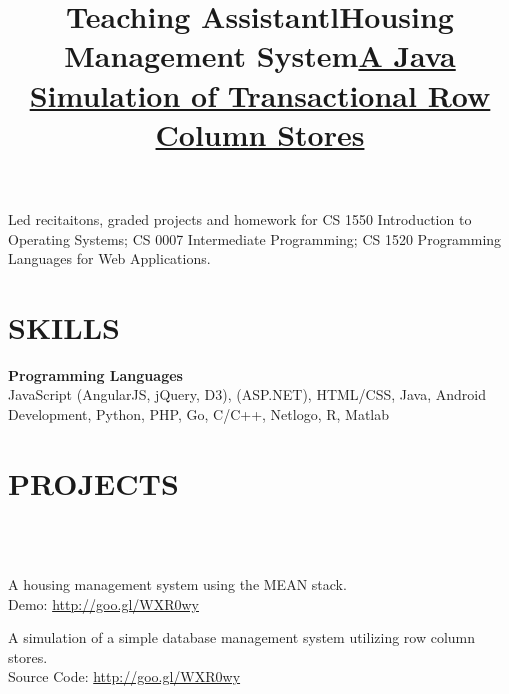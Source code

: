 \begin{resume}
\title{\textbf{Teaching Assistant}}
\begin{position}
	Led recitaitons, graded projects and homework for CS 1550 Introduction to Operating Systems; CS 0007 Intermediate Programming; CS 1520 Programming Languages for Web Applications.
\end{position}



\section{\textsc{SKILLS}}

\textbf{Programming Languages}\\
JavaScript (AngularJS, jQuery, D3), \CSharp (ASP.NET), HTML/CSS,
Java, Android Development, Python, PHP, Go, C/C++, Netlogo, R, Matlab


\section{\textsc{PROJECTS}}
\begin{formatb}
  \title{l}\\
   \body\\
\end{formatb}

\title{\textbf{Housing Management System}}
\begin{position}
	A housing management system using the MEAN stack.\\
	Demo: \url{http://goo.gl/WXR0wy}
\end{position}

\title{\textbf{\href{https://github.com/adorazhang/AndroidOpenCVTracking}{A Java Simulation of Transactional Row Column Stores}}}
\begin{position}
	A simulation of a simple database management system utilizing row column stores.\\
	Source Code: \url{http://goo.gl/WXR0wy}
\end{position}


\end{resume}
